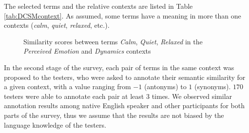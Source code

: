  The selected terms and the relative contexts are listed in Table \ref{tab:DCSMcontext}. As assumed, some terms have a meaning in more than one contexts (\textit{calm}, \textit{quiet}, \textit{relaxed}, etc.).

%


\begin{figure}[tbp]
\centering    
{} \hfil
{}
\caption{Similarity scores between terms \textit{Calm}, \textit{Quiet}, \textit{Relaxed }in the \textit{Perceived Emotion} and \textit{Dynamics} contexts}
\label{fig:DCSM:similarity}
\end{figure}


In the second stage of the survey, each pair of terms in the same context was proposed to the testers, who were asked to annotate their semantic similarity for a given context, with a value ranging from $-1$ (antonyms) to $1$ (synonyms). $170$ testers were able to annotate each pair at least $3$ times. We observed similar annotation results among native English speaker and other participants for both parts of the survey, thus we assume that the results are not biased by the language knowledge of the testers.

